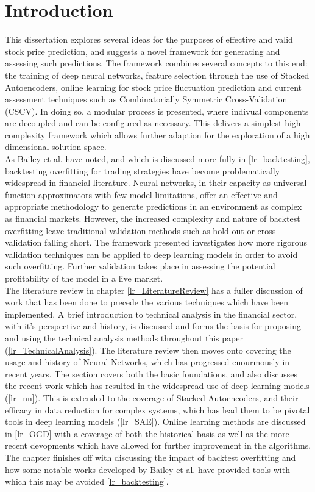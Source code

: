 \documentclass[a4paper,11pt,oneside]{article}
\theoremstyle{plain}
\theoremstyle{definition}
\begin{document}
\section{Introduction}\label{Introduction}

This dissertation explores several ideas for the purposes of effective and valid stock price prediction, and suggests a novel framework for generating and assessing such predictions. The framework combines several concepts to this end: the training of deep neural networks, feature selection through the use of Stacked Autoencoders, online learning for stock price fluctuation prediction and current assessment techniques such as Combinatorially Symmetric Cross-Validation (CSCV). In doing so, a modular process is presented, where indivual components are decoupled and can be configured as necessary. This delivers a simplest high complexity framework which allows further adaption for the exploration of a high dimensional solution space. 
~\\\newline
As Bailey et al. have noted, and which is discussed more fully in \ref{lr_backtesting}, backtesting overfitting for trading strategies have become problematically widespread in financial literature. Neural networks, in their capacity as universal function approximators with few model limitations, offer an effective and appropriate methodology to generate predictions in an environment as complex as financial markets. However, the increased complexity and nature of backtest overfitting leave traditional validation methods such as hold-out or cross validation falling short. The framework presented investigates how more rigorous validation techniques can be applied to deep learning models in order to avoid such overfitting. Further validation takes place in assessing the potential profitability of the model in a live market.
~\\\newline
The literature review in chapter \ref{lr_LiteratureReview} has a fuller discussion of work that has been done to precede the various techniques which have been implemented. A brief introduction to technical analysis in the financial sector, with it's perspective and history, is discussed and forms the basis for proposing and using the technical analysis methods throughout this paper (\ref{lr_TechnicalAnalysis}). The literature review then moves onto covering the usage and history of Neural Networks, which has progressed enourmously in recent years. The section covers both the basic foundations, and also discusses the recent work which has resulted in the widespread use of deep learning models (\ref{lr_nn}). This is extended to the coverage of Stacked Autoencoders, and their efficacy in data reduction for complex systems, which has lead them to be pivotal tools in deep learning models (\ref{lr_SAE}). Online learning methods are discussed in \ref{lr_OGD} with a coverage of both the historical basis as well as the more recent devopments which have allowed for further improvement in the algorithms. The chapter finishes off with discussing the impact of backtest overfitting and how some notable works developed by Bailey et al. have provided tools with which this may be avoided \ref{lr_backtesting}.
\end{document}
